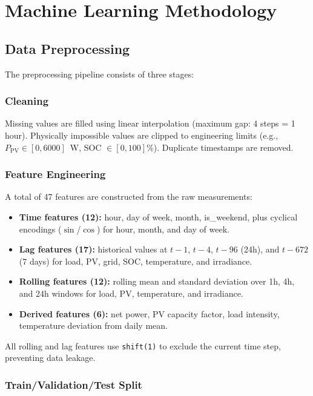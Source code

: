 \chapter{Machine Learning Methodology}
\label{ch:ml}

\section{Data Preprocessing}

The preprocessing pipeline consists of three stages:

\subsection{Cleaning}
Missing values are filled using linear interpolation (maximum gap: 4 steps = 1 hour). Physically impossible values are clipped to engineering limits (e.g., $P_{\text{PV}} \in [0, 6000]$~W, SOC $\in [0, 100]$\%). Duplicate timestamps are removed.

\subsection{Feature Engineering}

A total of 47 features are constructed from the raw measurements:

\begin{itemize}[nosep]
    \item \textbf{Time features (12):} hour, day of week, month, is\_weekend, plus cyclical encodings ($\sin$/$\cos$) for hour, month, and day of week.
    \item \textbf{Lag features (17):} historical values at $t-1$, $t-4$, $t-96$ (24h), and $t-672$ (7 days) for load, PV, grid, SOC, temperature, and irradiance.
    \item \textbf{Rolling features (12):} rolling mean and standard deviation over 1h, 4h, and 24h windows for load, PV, temperature, and irradiance.
    \item \textbf{Derived features (6):} net power, PV capacity factor, load intensity, temperature deviation from daily mean.
\end{itemize}

All rolling and lag features use \texttt{shift(1)} to exclude the current time step, preventing data leakage.

\subsection{Train/Validation/Test Split}

